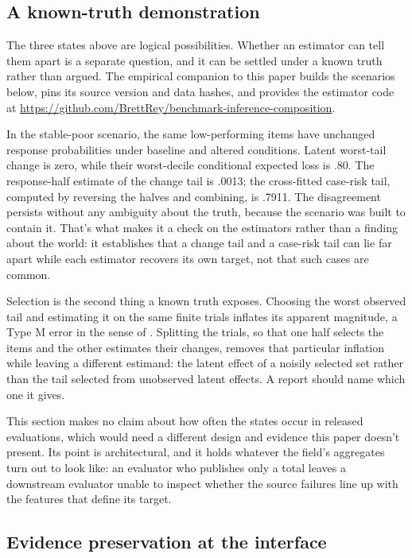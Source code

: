 \documentclass[12pt]{article}
\newif\ifanon
\begin{document}
\subsection{A known-truth demonstration}\label{ssec:released}

The three states above are logical possibilities. Whether an estimator can tell them apart is a separate question, and it can be settled under a known truth rather than argued. The empirical companion to this paper builds the scenarios below, pins its source version and data hashes, and provides the estimator code \ifanon in a companion repository whose URL is withheld for blind review\else at \url{https://github.com/BrettRey/benchmark-inference-composition}\fi.

In the stable-poor scenario, the same low-performing items have unchanged response probabilities under baseline and altered conditions. Latent worst-tail change is zero, while their worst-decile conditional expected loss is .80. The response-half estimate of the change tail is .0013; the cross-fitted case-risk tail, computed by reversing the halves and combining, is .7911. The disagreement persists without any ambiguity about the truth, because the scenario was built to contain it. That's what makes it a check on the estimators rather than a finding about the world: it establishes that a change tail and a case-risk tail can lie far apart while each estimator recovers its own target, not that such cases are common.

Selection is the second thing a known truth exposes. Choosing the worst observed tail and estimating it on the same finite trials inflates its apparent magnitude, a Type M error in the sense of \textcite{gelman2014types}. Splitting the trials, so that one half selects the items and the other estimates their changes, removes that particular inflation while leaving a different estimand: the latent effect of a noisily selected set rather than the tail selected from unobserved latent effects. A report should name which one it gives.

This section makes no claim about how often the states occur in released evaluations, which would need a different design and evidence this paper doesn't present. Its point is architectural, and it holds whatever the field's aggregates turn out to look like: an evaluator who publishes only a total leaves a downstream evaluator unable to inspect whether the source failures line up with the features that define its target.

\subsection{Evidence preservation at the interface}\label{ssec:preservation}
\end{document}
